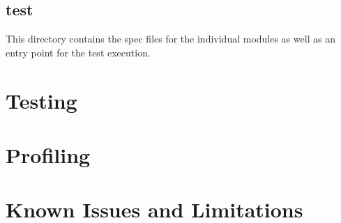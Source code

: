 \documentclass[11pt]{article}
\begin{document}
\subsection{test}

This directory contains the spec files for the individual modules as well as an entry point for the test execution.

\section{Testing}


\section{Profiling}


\section{Known Issues and Limitations}

\end{document}
